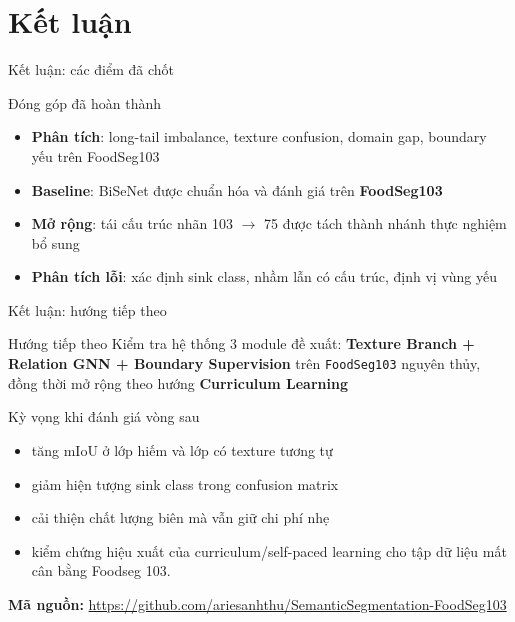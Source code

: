 \section{Kết luận}

\begin{frame}{Kết luận: các điểm đã chốt}
  \begin{block}{Đóng góp đã hoàn thành}
    \begin{itemize}
      \item \textbf{Phân tích}: long-tail imbalance, texture confusion, domain gap, boundary yếu trên FoodSeg103
      \item \textbf{Baseline}: BiSeNet được chuẩn hóa và đánh giá trên \textbf{FoodSeg103}
      \item \textbf{Mở rộng}: tái cấu trúc nhãn 103 $\to$ 75 được tách thành nhánh thực nghiệm bổ sung
      \item \textbf{Phân tích lỗi}: xác định sink class, nhầm lẫn có cấu trúc, định vị vùng yếu
    \end{itemize}
  \end{block}
\end{frame}

\begin{frame}{Kết luận: hướng tiếp theo}
  \begin{alertblock}{Hướng tiếp theo}
    Kiểm tra hệ thống 3 module đề xuất: \textbf{Texture Branch + Relation GNN + Boundary Supervision} trên \texttt{FoodSeg103} nguyên thủy, đồng thời mở rộng theo hướng \textbf{Curriculum Learning}
  \end{alertblock}
  \vspace{0.2em}
  \begin{block}{Kỳ vọng khi đánh giá vòng sau}
    \begin{itemize}
      \item tăng mIoU ở lớp hiếm và lớp có texture tương tự
      \item giảm hiện tượng sink class trong confusion matrix
      \item cải thiện chất lượng biên mà vẫn giữ chi phí nhẹ
      \item kiểm chứng hiệu xuất của curriculum/self-paced learning cho tập dữ liệu mất cân bằng Foodseg 103.
    \end{itemize}
  \end{block}

  \textbf{Mã nguồn:} \url{https://github.com/ariesanhthu/SemanticSegmentation-FoodSeg103}
\end{frame}

